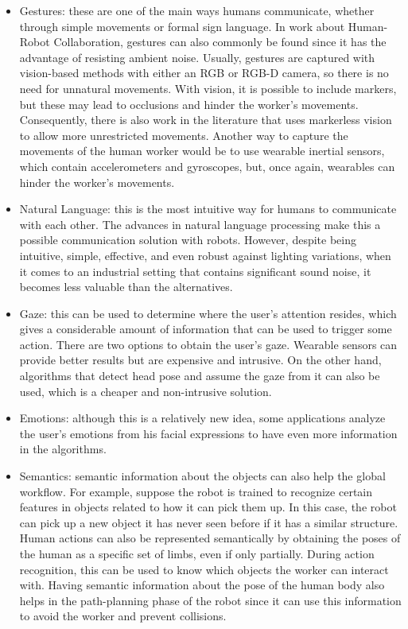 \begin{itemize}
\item Gestures: these are one of the main ways humans communicate, whether through simple movements or formal sign language. In work about Human-Robot Collaboration, gestures can also commonly be found since it has the advantage of resisting ambient noise. Usually, gestures are captured with vision-based methods with either an RGB or RGB-D camera, so there is no need for unnatural movements. With vision, it is possible to include markers, but these may lead to occlusions and hinder the worker's movements. Consequently, there is also work in the literature that uses markerless vision to allow more unrestricted movements. Another way to capture the movements of the human worker would be to use wearable inertial sensors, which contain accelerometers and gyroscopes, but, once again, wearables can hinder the worker's movements.

\item Natural Language: this is the most intuitive way for humans to communicate with each other. The advances in natural language processing make this a possible communication solution with robots. However, despite being intuitive, simple, effective, and even robust against lighting variations, when it comes to an industrial setting that contains significant sound noise, it becomes less valuable than the alternatives.

\item Gaze: this can be used to determine where the user's attention resides, which gives a considerable amount of information that can be used to trigger some action. There are two options to obtain the user's gaze. Wearable sensors can provide better results but are expensive and intrusive. On the other hand, algorithms that detect head pose and assume the gaze from it can also be used, which is a cheaper and non-intrusive solution.

\item Emotions: although this is a relatively new idea, some applications analyze the user's emotions from his facial expressions to have even more information in the algorithms.

\item Semantics: semantic information about the objects can also help the global workflow. For example, suppose the robot is trained to recognize certain features in objects related to how it can pick them up. In this case, the robot can pick up a new object it has never seen before if it has a similar structure. Human actions can also be represented semantically by obtaining the poses of the human as a specific set of limbs, even if only partially. During action recognition, this can be used to know which objects the worker can interact with. Having semantic information about the pose of the human body also helps in the path-planning phase of the robot since it can use this information to avoid the worker and prevent collisions.
\end{itemize}

